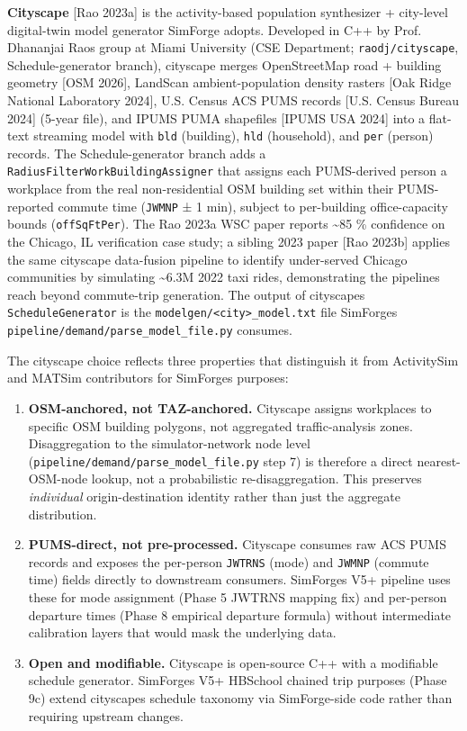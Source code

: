 \textbf{Cityscape} {[}Rao 2023a{]} is the activity-based population
synthesizer + city-level digital-twin model generator SimForge adopts.
Developed in C++ by Prof. Dhananjai Rao\textquotesingle s group at Miami
University (CSE Department; \texttt{raodj/cityscape}, Schedule-generator
branch), cityscape merges OpenStreetMap road + building geometry {[}OSM
2026{]}, LandScan ambient-population density rasters {[}Oak Ridge
National Laboratory 2024{]}, U.S. Census ACS PUMS records {[}U.S. Census
Bureau 2024{]} (5-year file), and IPUMS PUMA shapefiles {[}IPUMS USA
2024{]} into a flat-text streaming model with \texttt{bld} (building),
\texttt{hld} (household), and \texttt{per} (person) records. The
Schedule-generator branch adds a
\texttt{RadiusFilterWorkBuildingAssigner} that assigns each PUMS-derived
person a workplace from the real non-residential OSM building set within
their PUMS-reported commute time (\texttt{JWMNP} ± 1 min), subject to
per-building office-capacity bounds (\texttt{offSqFtPer}). The Rao 2023a
WSC paper reports \textasciitilde85 \% confidence on the Chicago, IL
verification case study; a sibling 2023 paper {[}Rao 2023b{]} applies
the same cityscape data-fusion pipeline to identify under-served Chicago
communities by simulating \textasciitilde6.3M 2022 taxi rides,
demonstrating the pipeline\textquotesingle s reach beyond commute-trip
generation. The output of cityscape\textquotesingle s
\texttt{ScheduleGenerator} is the
\texttt{modelgen/\textless{}city\textgreater{}\_model.txt} file
SimForge\textquotesingle s
\texttt{pipeline/demand/parse\_model\_file.py} consumes.

The cityscape choice reflects three properties that distinguish it from
ActivitySim and MATSim contributors for SimForge\textquotesingle s
purposes:

\begin{enumerate}
\def\labelenumi{\arabic{enumi}.}
\item
  \textbf{OSM-anchored, not TAZ-anchored.} Cityscape assigns workplaces
  to specific OSM building polygons, not aggregated traffic-analysis
  zones. Disaggregation to the simulator-network node level
  (\texttt{pipeline/demand/parse\_model\_file.py} step 7) is therefore a
  direct nearest-OSM-node lookup, not a probabilistic re-disaggregation.
  This preserves \emph{individual} origin-destination identity rather
  than just the aggregate distribution.
\item
  \textbf{PUMS-direct, not pre-processed.} Cityscape consumes raw ACS
  PUMS records and exposes the per-person \texttt{JWTRNS} (mode) and
  \texttt{JWMNP} (commute time) fields directly to downstream consumers.
  SimForge\textquotesingle s V5+ pipeline uses these for mode assignment
  (Phase 5 JWTRNS mapping fix) and per-person departure times (Phase 8
  empirical departure formula) without intermediate calibration layers
  that would mask the underlying data.
\item
  \textbf{Open and modifiable.} Cityscape is open-source C++ with a
  modifiable schedule generator. SimForge\textquotesingle s V5+ HBSchool
  chained trip purposes (Phase 9c) extend cityscape\textquotesingle s
  schedule taxonomy via SimForge-side code rather than requiring
  upstream changes.
\end{enumerate}

